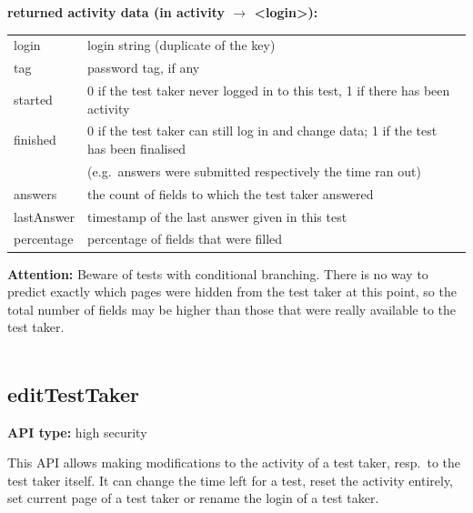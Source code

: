\documentclass[12pt]{article} %
\newenvironment{keyword}{\leavevmode\color{magenta}}{}
\newenvironment{properties}
{
    \footnotesize\renewcommand{\arraystretch}{1.30}
    \renewcommand{\tabcolsep}{0pt}
    \begin{longtable}{>{\begin{keyword}}p{3.1cm}<{\end{keyword}}p{13.9cm}}
        \hline
        }
        {
        \hline
    \end{longtable}\vspace{5mm}
}
\begin{document}
    \begin{minipage}{\textwidth}
        \textbf{returned activity data (in activity $\rightarrow$ <login>):}
        \begin{properties}
            login      & login string (duplicate of the key)                  \\
            tag        & password tag, if any                                 \\
            started    & 0 if the test taker never logged in to this test, 1 if there has been activity \\
            finished & 0 if the test taker can still log in and change data;
            1 if the test has been finalised \\    & (e.g.\ answers were submitted respectively the time ran out) \\
            answers & the count of fields to which the test taker answered      \\
            lastAnswer & timestamp of the last answer given in this test                \\
            percentage & percentage of fields that were filled                \\
        \end{properties}
    \end{minipage}


    \textbf{Attention:} Beware of tests with conditional branching.
    There is no way to predict exactly which pages were hidden from the test taker at this point, so the total number of fields may be higher than those that were really available to the test taker. \\\\

    \subsection{editTestTaker}\label{subsec:edittesttaker}

    \textbf{API type:} high security

    This API allows making modifications to the activity of a test taker, resp.\ to the test taker itself. It can change the time left for a test, reset the activity entirely, set current page of a test taker or rename the login of a test taker.
\end{document}
